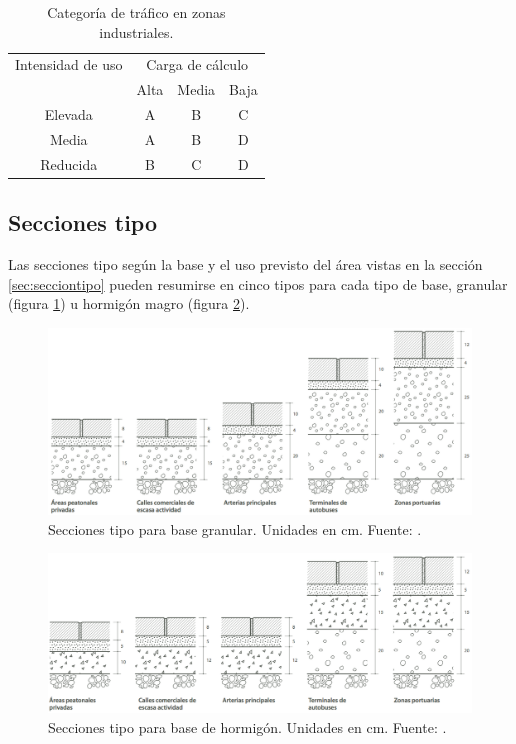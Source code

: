 \begin{table}[!htb]
\centering
\begin{tabular}{cccc}
\toprule
Intensidad de uso & \multicolumn{3}{c}{Carga de cálculo}\\
\cmidrule{2-4}
& Alta & Media & Baja\\
\midrule
Elevada & A & B & C\\
Media & A & B & D\\
Reducida & B & C & D\\
\bottomrule
\end{tabular}
\caption{Categoría de tráfico en zonas industriales.}
\label{categoriadetraficoenzonasindustriales}
\end{table}

\subsection{Secciones tipo}

Las secciones tipo según la base y el uso previsto del área vistas en la sección \ref{sec:secciontipo} pueden resumirse en cinco tipos para cada tipo de base, granular (figura \ref{fig:seccionestipogranular}) u hormigón magro (figura \ref{fig:seccionestipohormigon}).

\begin{figure}[!htb]
\centering
\includegraphics[width=15cm]{img/seccionestipo_1.png}
\caption[Secciones tipo para base granular.]{Secciones tipo para base granular. Unidades en cm. Fuente: \cite{fenollar}.}
\label{fig:seccionestipogranular}
\end{figure}

\begin{figure}[!htb]
\centering
\includegraphics[width=15cm]{img/seccionestipo_2.png}
\caption[Secciones tipo para base de hormigón.]{Secciones tipo para base de hormigón. Unidades en cm. Fuente: \cite{fenollar}.}
\label{fig:seccionestipohormigon}
\end{figure}

